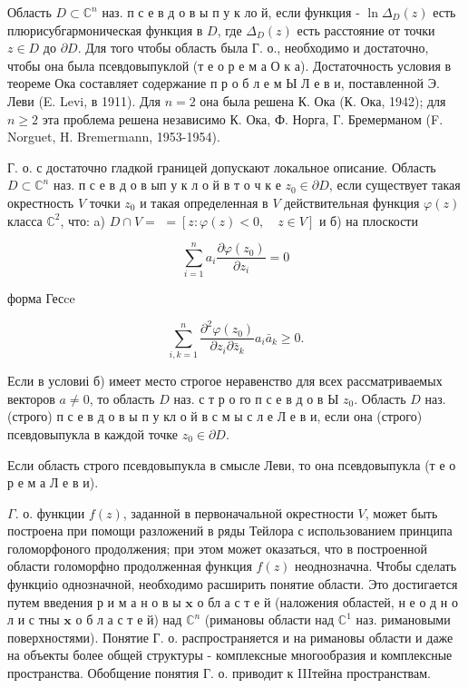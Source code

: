 \documentclass[10pt]{article}
\begin{document}
Область $D \subset \mathbb{C}^{n}$ наз. п с е в д о в ы п у к ло й, если функция - $\ln \Delta_{D}(z)$ есть плюрисубгармоническая функция в $D$, где $\Delta_{D}(z)$ есть расстояние от точки $z \in D$ до $\partial D$. Для того чтобы область была $Г$. о., необходимо и достаточно, чтобы она была псевдовыпуклой (т е о р е м а О к а). Достаточность условия в теореме Ока составляет содержание п р о б л е м Ы Л е в и, поставленной Э. Леви (E. Levi, в 1911). Для $n=2$ она была решена К. Ока (К. Ока, 1942); для $n \geqslant 2$ эта проблема решена независимо К. Ока, Ф. Норга, Г. Бремерманом (F. Norguet, H. Bremermann, 1953-1954).



Г. о. с достаточно гладкой границей допускают локальное описание. Область $D \subset \mathbb{C}^{n}$ наз. п с е в д о в ып у к л о й в т о ч к е $z_{0} \in \partial D$, если существует такая окрестность $V$ точки $z_{0}$ и такая определенная в $V$ действительная функция $\varphi(z)$ класса $\mathbb{C}^{2}$, что: a) $D \cap V=$ $=[z: \varphi(z)<0, \quad z \in V]$ и б) на плоскости



\[

\sum_{i=1}^{n} a_{i} \frac{\partial \varphi\left(z_{0}\right)}{\partial z_{i}}=0

\]



форма Гесce



\[

\sum_{i, k=1}^{n} \frac{\partial^{2} \varphi\left(z_{0}\right)}{\partial z_{i} \partial \bar{z}_{k}} a_{i} \bar{a}_{k} \geqslant 0 .

\]



Если в условиі б) имеет место строгое неравенство для всех рассматриваемых векторов $a \neq 0$, то область $D$ наз. с т р о го п с е в д о в Ы $z_{0}$. Область $D$ наз. (строго) п с е в д о в ы $п$ у кл о й в с м ы с л е Л е в и, если она (строго) псевдовыпукла в каждой точке $z_{0} \in \partial D$.



Если область строго псевдовыпукла в смысле Леви, то она псевдовыпукла (т е о р е м а Л е в и).



$\Gamma$. о. функции $f(z)$, заданной в первоначальной окрестности $V$, может быть построена при помощи разложений в ряды Тейлора с использованием принципа голоморфоного продолжения; при этом может оказаться, что в построенной области голоморфно продолженная функция $f(z)$ неоднозначна. Чтобы сделать функциіо однозначной, необходимо расширить понятие области. Это достигается путем введения р и м а н о в ы $\mathbf{x}$ о бл а с т е й (наложения областей, н е о д н о л и с тны $\mathbf{x}$ о б л а с т е й) над $\mathbb{C}^{n}$ (римановы области над $\mathbb{C}^{1}$ наз. римановыми поверхностями). Понятие Г. о. распространяется и на римановы области и даже на объекты более общей структуры - комплексные многообразия и комплексные пространства. Обобщение понятия Г. о. приводит к IIIтейна пространствам.
\end{document}

